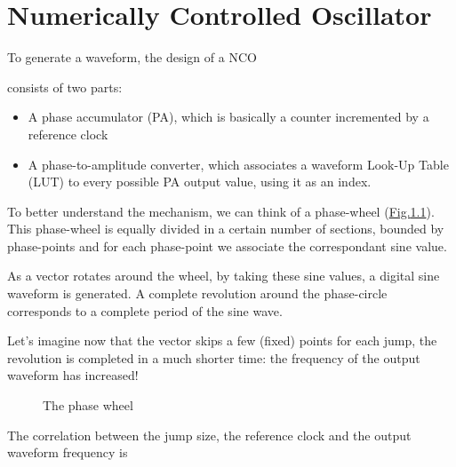 \documentclass[letterpaper,10pt,english,openany,oneside]{sphinxmanual}
\begin{document}
\chapter{Numerically Controlled Oscillator}
\label{\detokenize{paper/nco:numerically-controlled-oscillator}}\label{\detokenize{paper/nco::doc}}
To generate a waveform, the design of a NCO %
\begin{footnote}[1]\sphinxAtStartFootnote
{}
%
\end{footnote} consists of two parts:
\begin{itemize}
\item {} 
A phase accumulator (PA), which is basically a counter incremented by a reference clock

\item {} 
A phase-to-amplitude converter, which associates a waveform Look-Up Table (LUT) to every possible PA output value, using it as an index.

\end{itemize}

\begin{DUlineblock}{0em}
\item[] To better understand the mechanism, we can think of a phase-wheel (\hyperref[\detokenize{paper/nco:phase-wheel}]{Fig.\@ \ref{\detokenize{paper/nco:phase-wheel}}}). This phase-wheel is equally divided in a certain number of sections, bounded by phase-points and for each phase-point we associate the correspondant sine value.
\item[] As a vector rotates around the wheel, by taking these sine values, a digital sine waveform is generated. A complete revolution around the phase-circle corresponds to a complete period of the sine wave.
\end{DUlineblock}

Let’s imagine now that the vector skips a few (fixed) points for each jump, the revolution is completed in a much shorter time: the frequency of the output waveform has increased!

\begin{figure}[htbp]
\centering
\capstart

\noindent{}
\caption{The phase wheel}\label{\detokenize{paper/nco:id3}}\label{\detokenize{paper/nco:phase-wheel}}\end{figure}

The correlation between the jump size, the reference clock and the output waveform frequency is
\end{document}
